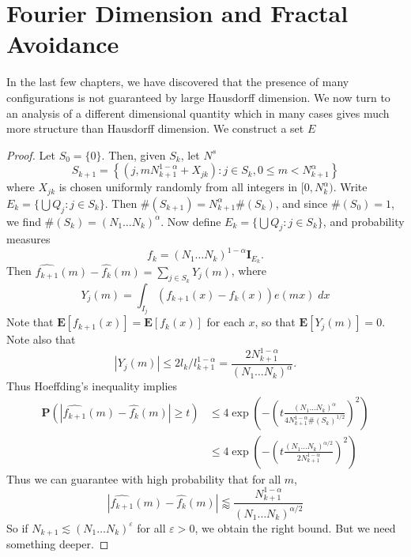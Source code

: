 
\chapter{Fourier Dimension and Fractal Avoidance}
\label{ch:RoughSets}


In the last few chapters, we have discovered that the presence of many configurations is not guaranteed by large Hausdorff dimension. We now turn to an analysis of a different dimensional quantity which in many cases gives much more structure than Hausdorff dimension. We construct a set $E$

\begin{proof}
	Let $S_0 = \{ 0 \}$. Then, given $S_k$, let $N^s$
	\[ S_{k+1} = \left\{ (j, mN_{k+1}^{1-\alpha} + X_{jk}) : j \in S_k, 0 \leq m < N_{k+1}^\alpha \right\} \]
	where $X_{jk}$ is chosen uniformly randomly from all integers in $[0,N_k^\alpha)$. Write $E_k = \{ \bigcup Q_j : j \in S_k \}$. Then $\#(S_{k+1}) = N_{k+1}^\alpha \#(S_k)$, and since $\#(S_0) = 1$, we find $\#(S_k) = (N_1 \dots N_k)^\alpha$. Now define $E_k = \{ \bigcup Q_j : j \in S_k \}$, and probability measures
	\[ f_k = (N_1 \dots N_k)^{1 - \alpha} \mathbf{I}_{E_k}. \]
	Then $\widehat{f_{k+1}}(m) - \widehat{f_k}(m) = \sum_{j \in S_k} Y_j(m)$, where
	\[ Y_j(m) = \int_{I_j} (f_{k+1}(x) - f_k(x)) e(mx)\; dx \]
	Note that $\mathbf{E}[f_{k+1}(x)] = \mathbf{E}[f_k(x)]$ for each $x$, so that $\mathbf{E}[Y_j(m)] = 0$. Note also that
	\[ |Y_j(m)| \leq 2l_k / l_{k+1}^{1-\alpha} = \frac{2 N_{k+1}^{1-\alpha}}{(N_1 \dots N_k)^\alpha}. \]
	Thus Hoeffding's inequality implies
	\begin{align*}
		\mathbf{P} \left( |\widehat{f_{k+1}}(m) - \widehat{f_k}(m)| \geq t \right) &\leq 4 \exp \left( - \left( t \frac{(N_1 \dots N_k)^\alpha}{4 N_{k+1}^{1-\alpha} \#(S_k)^{1/2}} \right)^2 \right)\\
		&\leq 4 \exp \left( - \left( t \frac{(N_1 \dots N_k)^{\alpha/2}}{2 N_{k+1}^{1-\alpha}} \right)^2 \right)
	\end{align*}
	Thus we can guarantee with high probability that for all $m$,
	\[ |\widehat{f_{k+1}}(m) - \widehat{f_k}(m)| \lessapprox \frac{N_{k+1}^{1-\alpha}}{(N_1 \dots N_k)^{\alpha/2}} \]
	So if $N_{k+1} \lesssim (N_1 \dots N_k)^\varepsilon$ for all $\varepsilon > 0$, we obtain the right bound. But we need something deeper.


\end{proof}
